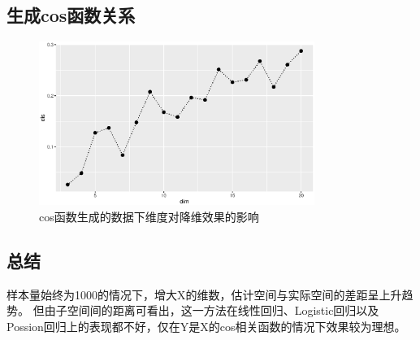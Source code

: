 \subsection{生成cos函数关系}
\begin{figure}[H]
    \centering
    \includegraphics[width=0.8\textwidth]{image/cos_phd.eps}
    \caption{cos函数生成的数据下维度对降维效果的影响}
\end{figure}

\subsection{总结}
样本量始终为1000的情况下，增大X的维数，估计空间与实际空间的差距呈上升趋势。
但由子空间间的距离可看出，这一方法在线性回归、Logistic回归以及Possion回归上的表现都不好，仅在Y是X的cos相关函数的情况下效果较为理想。


